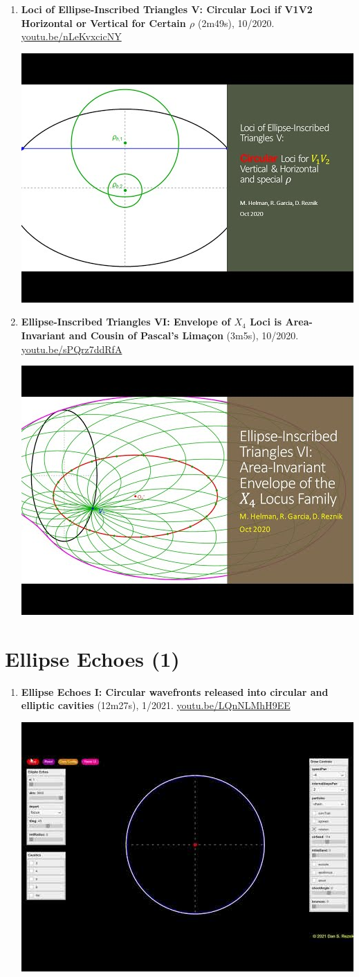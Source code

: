 \documentclass[12pt]{article}
\begin{document}
\begin{enumerate}[resume]
% 
\item \textbf{Loci of Ellipse-Inscribed Triangles V: Circular Loci if V1V2 Horizontal or Vertical for Certain $\rho$} (2m49s), 10/2020. \href{https://youtu.be/nLeKvxcicNY}{\url{youtu.be/nLeKvxcicNY}}
\begin{center}\includegraphics[width=.5\textwidth]{pics/nLeKvxcicNY.jpg}\end{center}
% 
\item \textbf{Ellipse-Inscribed Triangles VI: Envelope of $X_{4}$ Loci is Area-Invariant and Cousin of Pascal's Limaçon} (3m5s), 10/2020. \href{https://youtu.be/sPQrz7ddRfA}{\url{youtu.be/sPQrz7ddRfA}}
\begin{center}\includegraphics[width=.5\textwidth]{pics/sPQrz7ddRfA.jpg}\end{center}
% 
\end{enumerate}

\section{Ellipse Echoes (1)}

\begin{enumerate}[resume]
\item \textbf{Ellipse Echoes I: Circular wavefronts released into circular and elliptic cavities} (12m27s), 1/2021. \href{https://youtu.be/LQnNLMhH9EE}{\url{youtu.be/LQnNLMhH9EE}}
\begin{center}\includegraphics[width=.5\textwidth]{pics/LQnNLMhH9EE.jpg}\end{center}
% 
\end{enumerate}
\end{document}
